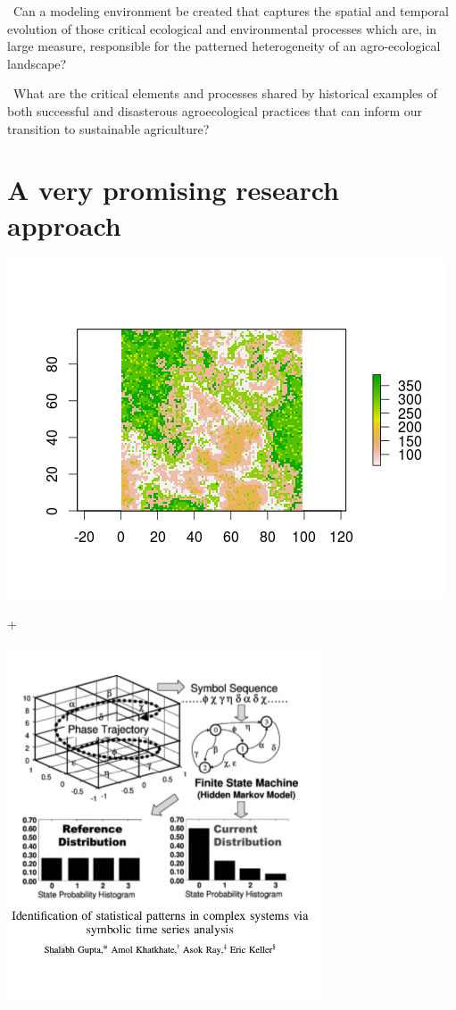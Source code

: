 \documentclass[
paper=128mm:96mm, %
fontsize=11pt, %
pagesize, %
parskip=half-, %
]{scrartcl} %
\theoremstyle{mythmstyle} %
\begin{document}
\textasteriskcentered \ Can a modeling environment be created that captures the spatial and temporal evolution of those critical ecological and environmental processes which are, in large measure, responsible for the patterned heterogeneity of an agro-ecological landscape?

\textasteriskcentered \ What are the critical elements and processes shared by historical examples of both successful and disasterous agroecological practices that can inform our transition to sustainable agriculture?
\clearpage
\section {A very promising research approach}
\scriptsize
\begin{minipage}{.4\textwidth}
   \centering
  \includegraphics[width=.8\linewidth]{Image6}
 \end{minipage}
+
\begin{minipage}{.4\textwidth}
  \centering
  \includegraphics[width=.8\linewidth]{Image7}
\end{minipage}
\end{document}
